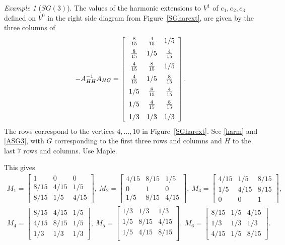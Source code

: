 \documentclass[a4paper]{amsart}
\theoremstyle{plain}
\theoremstyle{definition}
\theoremstyle{remark}
\newtheorem{example}[theorem]{Example}
\begin{document}
\begin{example}[$ SG(3) $]  
The values of the harmonic extensions  to $ V^{1} $ of $ e_1, e_2, e_3 $ defined on $ V^{0} $  in the right side diagram from Figure~\ref{SGharext}, are given by the three columns of 
\[
-A_{HH}^{-1}A_{HG} =  \left[ \begin {array}{ccc} {\frac {8}{15}}&{\frac {4}{15}}&1/5
\\\noalign{\medskip}{\frac {8}{15}}&1/5&{\frac {4}{15}}
\\\noalign{\medskip}{\frac {4}{15}}&{\frac {8}{15}}&1/5
\\\noalign{\medskip}{\frac {4}{15}}&1/5&{\frac {8}{15}}
\\\noalign{\medskip}1/5&{\frac {8}{15}}&{\frac {4}{15}}
\\\noalign{\medskip}1/5&{\frac {4}{15}}&{\frac {8}{15}}
\\\noalign{\medskip}1/3&1/3&1/3\end {array} \right] .
\]
The rows correspond to the vertices $ 4,\dots, 10 $ in Figure~\ref{SGharext}.
See  \eqref{harm} and \eqref{ASG3}, with $ G $ corresponding to the first three rows and columns  and $ H $ to the last 7 rows and columns. Use Maple.

This gives
\begin{equation} \label{}
\begin{gathered}
M_1 = \begin{bmatrix}  1&0&0 \\ 8/15&4/15&1/5 \\  8/15 & 1/5 & 4/15 \end{bmatrix}, \  
M_2 = \begin{bmatrix}  4/15&8/15&1/5 \\ 0&1&0 \\   1/5 & 8/15   & 4/15 \end{bmatrix}, \  
M_3 = \begin{bmatrix}  4/15&1/5 & 8/15  \\   1/5 & 4/15   & 8/15  \\ 0&0&1 \end{bmatrix},   \\
M_4 = \begin{bmatrix}  8/15&4/15&1/5 \\  4/15 & 8/15 & 1/5 \\ 1/3 & 1/3 & 1/3\end{bmatrix}, \ 
M_5 = \begin{bmatrix}  1/3 & 1/3 & 1/3 \\1/5 & 8/15&4/15\\  1/5 &4/15 & 8/15   \\ \end{bmatrix}, \ 
M_6 = \begin{bmatrix}  8/15&1/5 & 4/15 \\ 1/3 & 1/3 & 1/3 \\  4/15 & 1/5 & 8/15   \end{bmatrix}.
\end{gathered}
\end{equation} 
\end{example} 
\end{document}
